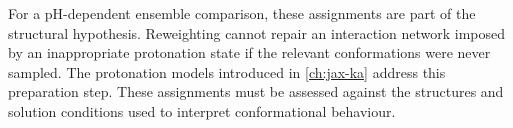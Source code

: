 For a pH-dependent ensemble comparison, these assignments are part of the structural hypothesis. Reweighting cannot repair an interaction network imposed by an inappropriate protonation state if the relevant conformations were never sampled. The protonation models introduced in \cref{ch:jax-ka} address this preparation step. These assignments must be assessed against the structures and solution conditions used to interpret conformational behaviour.

